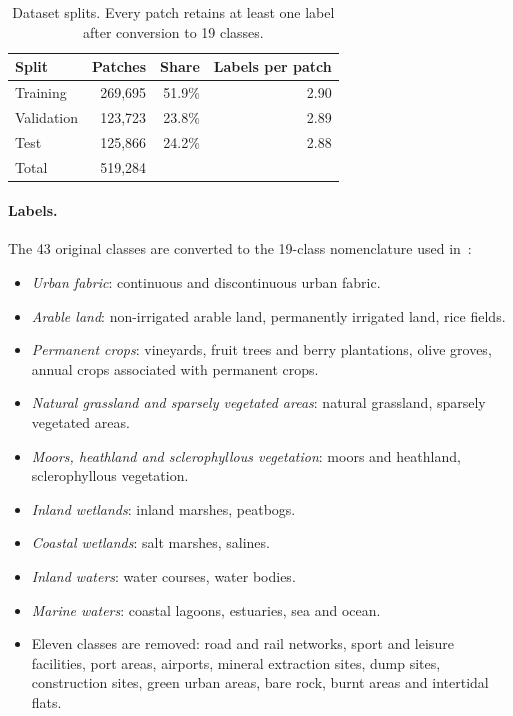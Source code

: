 \documentclass[11pt]{article}
\begin{document}
\begin{table}[!htbp]
\centering
\caption{Dataset splits. Every patch retains at least one label after conversion to 19 classes.}
\label{tab:splits}
\begin{tabular}{lrrr}
\toprule
Split & Patches & Share & Labels per patch \\
\midrule
Training   & 269,695 & 51.9\% & 2.90 \\
Validation & 123,723 & 23.8\% & 2.89 \\
Test       & 125,866 & 24.2\% & 2.88 \\
\midrule
Total      & 519,284 & & \\
\bottomrule
\end{tabular}
\end{table}

\paragraph{Labels.}
The 43 original classes are converted to the 19-class nomenclature used in~\cite{papoutsis}:

\begin{itemize}
  \item \emph{Urban fabric}: continuous and discontinuous urban fabric.
  \item \emph{Arable land}: non-irrigated arable land, permanently irrigated land, rice fields.
  \item \emph{Permanent crops}: vineyards, fruit trees and berry plantations, olive groves, annual crops
        associated with permanent crops.
  \item \emph{Natural grassland and sparsely vegetated areas}: natural grassland, sparsely vegetated areas.
  \item \emph{Moors, heathland and sclerophyllous vegetation}: moors and heathland, sclerophyllous vegetation.
  \item \emph{Inland wetlands}: inland marshes, peatbogs.
  \item \emph{Coastal wetlands}: salt marshes, salines.
  \item \emph{Inland waters}: water courses, water bodies.
  \item \emph{Marine waters}: coastal lagoons, estuaries, sea and ocean.
  \item Eleven classes are removed: road and rail networks, sport and leisure facilities, port areas,
        airports, mineral extraction sites, dump sites, construction sites, green urban areas, bare rock,
        burnt areas and intertidal flats.
\end{itemize}
\end{document}
